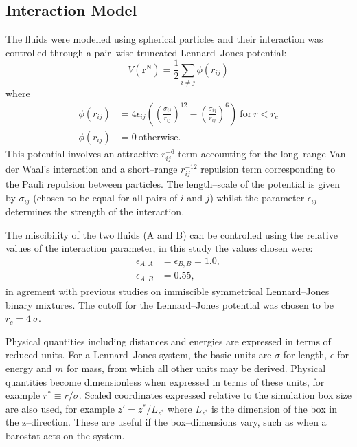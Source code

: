 \subsection{Interaction Model}\label{InteractionModel}
The fluids were modelled using spherical particles and their interaction was controlled through a pair--wise truncated Lennard--Jones potential:
\begin{equation}
V \left( \mathbf{r}^{\mathrm{N}} \right) = \frac{1}{2} \sum_{i\neq j} \phi \left( r_{ij} \right)
\end{equation}
where
\begin{align}
\label{LJ}
\phi \left( r_{ij} \right) &= 4 \epsilon_{ij} \left( \left( \frac{\sigma_{ij}}{r_{ij}}\right)^{12} - \left( \frac{\sigma_{ij}}{r_{ij}}\right)^{6} \right)\ \mathrm{for}\ r < r_{c}\\
\phi \left( r_{ij} \right) &= 0\ \mathrm{otherwise}.
\end{align}
This potential involves an attractive $r_{ij}^{-6}$ term accounting for the long--range Van der Waal's interaction and a short--range $r_{ij}^{-12}$ repulsion term corresponding to the Pauli repulsion between particles.
The length--scale of the potential is given by $\sigma_{ij}$ (chosen to be equal for all pairs of $i$ and $j$) whilst the parameter $\epsilon_{ij}$ determines the strength of the interaction. 

The miscibility of the two fluids (A and B) can be controlled using the relative values of the interaction parameter, in this study the values chosen were:
\begin{align}
\epsilon_{A,A} &= \epsilon_{B,B} = 1.0,\\
\epsilon_{A,B} &= 0.55,
\end{align}
in agrement with previous studies on immiscible symmetrical Lennard--Jones binary mixtures.\cite{MorenzoRazo,Blas,HolgerBoppHampe}
The cutoff for the Lennard--Jones potential was chosen to be $r_{c} = 4\ \sigma$.

Physical quantities including distances and energies are expressed in terms of reduced units.
For a Lennard--Jones system, the basic units are $\sigma$ for length, $\epsilon$ for energy and $m$ for mass, from which all other units may be derived.\cite{FrenkelSmit}
Physical quantities become dimensionless when expressed in terms of these units, for example $r^{*} \equiv r / \sigma$.
Scaled coordinates expressed relative to the simulation box size are also used, for example $z' = z^{*} / L_{z^{*}}$ where $L_{z^{*}}$ is the dimension of the box in the z--direction.
These are useful if the box--dimensions vary, such as when a barostat acts on the system.

